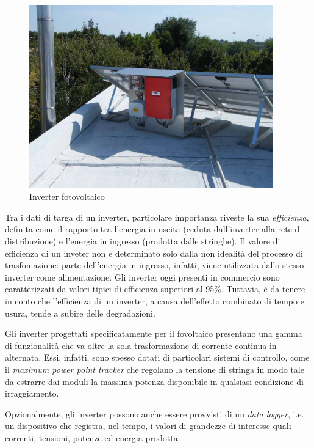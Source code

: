 %
%
\begin{figure}[!h]
\centering
\includegraphics[width=300pt]{img/pv-inverter.jpg}
\caption{Inverter fotovoltaico}
\end{figure}
%
Tra i dati di targa di un inverter, particolare importanza riveste la sua 
\emph{efficienza}, definita come il rapporto tra l'energia in uscita 
(ceduta dall'inverter alla rete di distribuzione) e l'energia in ingresso 
(prodotta dalle stringhe).
%
Il valore di efficienza di un inveter non \`e determinato solo dalla 
non idealit\`a del processo di trasfomazione: parte dell'energia in ingresso, 
infatti, viene utilizzata dallo stesso inverter come alimentazione.
%
Gli inverter oggi presenti in commercio sono caratterizzati da valori tipici di
efficienza superiori al 95\%. Tuttavia, \`e da tenere in conto che l'efficienza 
di un inverter, a causa dell'effetto combinato di tempo e usura, tende a 
subire delle degradazioni.
%

%
Gli inverter progettati specificatamente per il fovoltaico presentano una gamma 
di funzionalit\`a che va oltre la sola trasformazione di corrente continua 
in alternata. Essi, infatti, sono spesso dotati di particolari sistemi di 
controllo, come il \emph{maximum power point tracker} che regolano la tensione 
di stringa in modo tale da estrarre dai moduli la massima potenza disponibile 
in qualsiasi condizione di irraggiamento.
%

%
Opzionalmente, gli inverter possono anche essere provvisti di un \emph{data logger}, 
i.e. un dispositivo che registra, nel tempo, i valori di grandezze di interesse quali 
correnti, tensioni, potenze ed energia prodotta.
%

%



